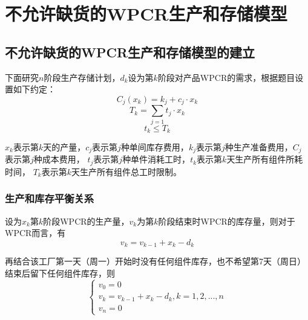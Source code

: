 %
%
%
%
%

\chapter{不允许缺货的WPCR生产和存储模型}

\section{不允许缺货的WPCR生产和存储模型的建立}

下面研究$n$阶段生产存储计划，$d_k$设为第$k$阶段对产品WPCR的需求，根据题目设置如下约定：
\begin{equation}
    C_j(x_k)=k_j + c_j \cdot x_k
\end{equation}
\begin{equation}
    T_k=\sum_{j=1}t_j \cdot x_k
\end{equation}
\begin{equation}
    t_k \leq T_k
\end{equation}

$x_k$表示第$k$天的产量，$c_j$表示第$j$种单间库存费用，$k_j$表示第$j$种生产准备费用，$C_j$表示第$j$种成本费用，
$t_j$表示第$j$种单件消耗工时，$t_k$表示第$k$天生产所有组件所耗时间，
$T_k$表示第$k$天生产所有组件总工时限制\cite{芮世春2012生产与存储问题}。

\subsection{生产和库存平衡关系}

设为$x_k$第$k$阶段WPCR的生产量，$v_k$为第$k$阶段结束时WPCR的库存量，则对于WPCR而言，有
\begin{equation}
    v_k = v_{k-1} + x_k - d_k
\end{equation}

再结合该工厂第一天（周一）开始时没有任何组件库存，也不希望第7天（周日）结束后留下任何组件库存，则
\begin{equation}
    \begin{cases}
        v_0=0 \\ 
        v_k=v_{k-1} + x_k - d_k,k=1,2,...,n \\ 
        v_n=0
    \end{cases}
\end{equation}

